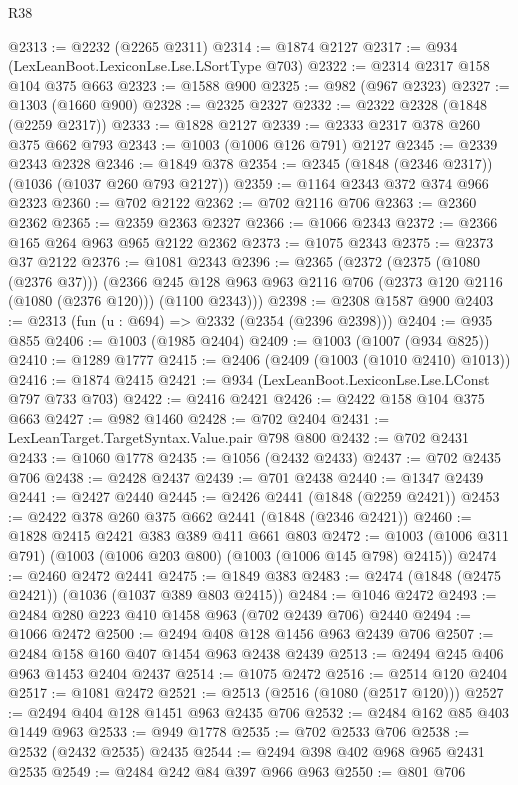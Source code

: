 \begin{lexlean}{R38}
\begin{coremodule}
@2313 := @2232 (@2265 @2311)
@2314 := @1874 @2127
@2317 := @934 (LexLeanBoot.LexiconLse.Lse.LSortType @703)
@2322 := @2314 @2317 @158 @104 @375 @663
@2323 := @1588 @900
@2325 := @982 (@967 @2323)
@2327 := @1303 (@1660 @900)
@2328 := @2325 @2327
@2332 := @2322 @2328 (@1848 (@2259 @2317))
@2333 := @1828 @2127
@2339 := @2333 @2317 @378 @260 @375 @662 @793
@2343 := @1003 (@1006 @126 @791) @2127
@2345 := @2339 @2343 @2328
@2346 := @1849 @378
@2354 := @2345 (@1848 (@2346 @2317)) (@1036 (@1037 @260 @793 @2127))
@2359 := @1164 @2343 @372 @374 @966 @2323
@2360 := @702 @2122
@2362 := @702 @2116 @706
@2363 := @2360 @2362
@2365 := @2359 @2363 @2327
@2366 := @1066 @2343
@2372 := @2366 @165 @264 @963 @965 @2122 @2362
@2373 := @1075 @2343
@2375 := @2373 @37 @2122
@2376 := @1081 @2343
@2396 := @2365
    (@2372
      (@2375 (@1080 (@2376 @37)))
      (@2366 @245 @128 @963 @963 @2116 @706 (@2373 @120 @2116 (@1080 (@2376 @120))) (@1100 @2343)))
@2398 := @2308 @1587 @900
@2403 := @2313 (fun (u : @694) => @2332 (@2354 (@2396 @2398)))
@2404 := @935 @855
@2406 := @1003 (@1985 @2404)
@2409 := @1003 (@1007 (@934 @825))
@2410 := @1289 @1777
@2415 := @2406 (@2409 (@1003 (@1010 @2410) @1013))
@2416 := @1874 @2415
@2421 := @934 (LexLeanBoot.LexiconLse.Lse.LConst @797 @733 @703)
@2422 := @2416 @2421
@2426 := @2422 @158 @104 @375 @663
@2427 := @982 @1460
@2428 := @702 @2404
@2431 := LexLeanTarget.TargetSyntax.Value.pair @798 @800
@2432 := @702 @2431
@2433 := @1060 @1778
@2435 := @1056 (@2432 @2433)
@2437 := @702 @2435 @706
@2438 := @2428 @2437
@2439 := @701 @2438
@2440 := @1347 @2439
@2441 := @2427 @2440
@2445 := @2426 @2441 (@1848 (@2259 @2421))
@2453 := @2422 @378 @260 @375 @662 @2441 (@1848 (@2346 @2421))
@2460 := @1828 @2415 @2421 @383 @389 @411 @661 @803
@2472 := @1003 (@1006 @311 @791) (@1003 (@1006 @203 @800) (@1003 (@1006 @145 @798) @2415))
@2474 := @2460 @2472 @2441
@2475 := @1849 @383
@2483 := @2474 (@1848 (@2475 @2421)) (@1036 (@1037 @389 @803 @2415))
@2484 := @1046 @2472
@2493 := @2484 @280 @223 @410 @1458 @963 (@702 @2439 @706) @2440
@2494 := @1066 @2472
@2500 := @2494 @408 @128 @1456 @963 @2439 @706
@2507 := @2484 @158 @160 @407 @1454 @963 @2438 @2439
@2513 := @2494 @245 @406 @963 @1453 @2404 @2437
@2514 := @1075 @2472
@2516 := @2514 @120 @2404
@2517 := @1081 @2472
@2521 := @2513 (@2516 (@1080 (@2517 @120)))
@2527 := @2494 @404 @128 @1451 @963 @2435 @706
@2532 := @2484 @162 @85 @403 @1449 @963
@2533 := @949 @1778
@2535 := @702 @2533 @706
@2538 := @2532 (@2432 @2535) @2435
@2544 := @2494 @398 @402 @968 @965 @2431 @2535
@2549 := @2484 @242 @84 @397 @966 @963
@2550 := @801 @706

\end{coremodule}
\end{lexlean}
